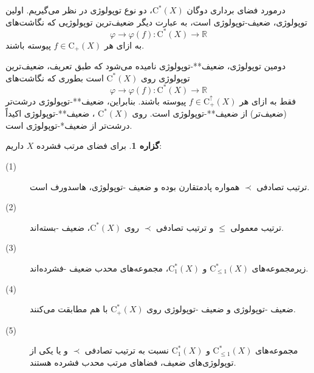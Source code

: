 \documentclass[12pt,a4paper]{article}
\theoremstyle{definition}
\theoremstyle{theorem}
\newtheorem{proposition}[definition]{گزاره}
\theoremstyle{definition}
\newcommand{\bR}{\mathbb{R}}
\newcommand{\rC}{\mathrm{C}}
\begin{document}
درمورد فضای برداری دوگان 
$ \rC^{*}(X) $، دو نوع توپولوژی در نظر می‌گیریم. اولین توپولوژی، 
  ضعیف\lr{*}-توپولوژی
  است، به عبارت دیگر ضعیف‌ترین توپولوژیی که نگاشت‌های 
$$ \varphi\rightarrow \varphi(f):\rC^{*}(X)\rightarrow \bR $$
به ازای هر 
$ f\in \rC_{+}(X) $
پیوسته باشند. 

دومین توپولوژی، 
ضعیف**-توپولوژی
  نامیده می‌شود که طبق تعریف، ضعیف‌ترین توپولوژی روی 
$ \rC^{*}(X) $
است بطوری که نگاشت‌های 
$$  \varphi\rightarrow \varphi(f):\rC^{*}(X)\rightarrow \bR  $$
فقط به ازای هر 
$ f\in \rC_{+}^{\uparrow}(X)$
پیوسته باشند. بنابراین، 
ضعیف**-توپولوژی  درشت‌تر
(ضعیف‌تر) از 
ضعیف**-توپولوژی است. روی 
$ \rC^{*}(X) $%
، ضعیف**-توپولوژی اکیداً 
\linebreak
درشت‌تر از 
ضعیف*-توپولوژی است.
\begin{proposition}\label{4.1} 
برای فضای مرتب فشرده 
$ X $
داریم:
\begin{description}
\item[(1)] 
ترتیب تصادفی    
$ \prec $
همواره پادمتقارن بوده و ضعیف 
 \lr{**}
-توپولوژی، هاسدورف است.
\item[(2)] 
ترتیب معمولی    
$ \leq $
و ترتیب تصادفی 
$ \prec $
روی 
$ \rC^{*}(X) $،  ضعیف 
 \lr{*}
-بسته‌اند. 

\item[(3)] 
زیرمجموعه‌های 
$ \mathrm{C}_{\leq1}^{*}(X) $
و
$ \mathrm{C}_{1}^{*}(X) $، مجموعه‌های محدب ضعیف 
 \lr{*}
 -فشرده‌اند.
\item[(4)] 
ضعیف 
 \lr{**}
-توپولوژی و ضعیف 
 \lr{*}
-توپولوژی روی 
$ \mathrm{C}_{+}^{*}(X) $
با هم مطابقت می‌کنند.

\item[(5)] 
مجموعه‌های 
$ \mathrm{C}_{\leq1}^{*}(X) $
و
$ \mathrm{C}_{1}^{*}(X) $
نسبت به ترتیب تصادفی 
$ \prec $
و یا یکی از توپولوژی‌های ضعیف، فضاهای مرتب محدب فشرده هستند.
\end{description}

\end{proposition}
\end{document}
